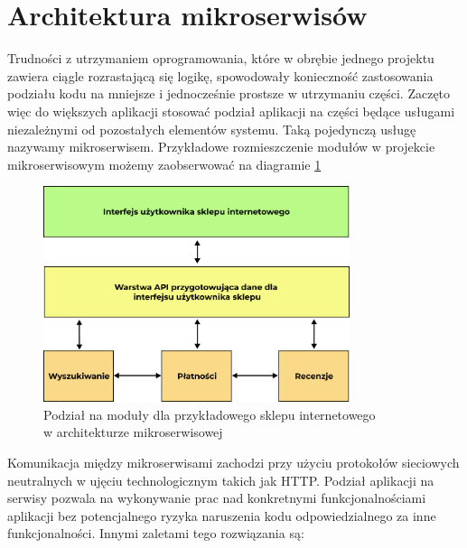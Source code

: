 \documentclass{SGGW-thesis}
\begin{document}
  \section{Architektura mikroserwisów}

  Trudności z utrzymaniem oprogramowania, które w obrębie jednego projektu zawiera ciągle rozrastającą się logikę, spowodowały konieczność zastosowania podziału kodu na mniejsze i jednocześnie prostsze w utrzymaniu części. 
  Zaczęto więc do większych aplikacji stosować podział aplikacji na części będące usługami niezależnymi od pozostałych elementów systemu. Taką pojedynczą usługę nazywamy mikroserwisem. Przykładowe rozmieszczenie modułów w projekcie mikroserwisowym możemy zaobserwować na diagramie \ref{fig:microservices_diagram}


  \begin{figure}[h]
    \centering
    \captionsetup{justification=centering}
    \includegraphics[width=0.8\textwidth]{microservices_diagram.png}
    \caption{Podział na moduły dla przykładowego sklepu internetowego \\ w architekturze mikroserwisowej}
    \label{fig:microservices_diagram}
  \end{figure}

  Komunikacja między mikroserwisami zachodzi przy użyciu protokołów sieciowych neutralnych w ujęciu technologicznym takich jak HTTP. Podział aplikacji na serwisy pozwala na wykonywanie prac nad konkretnymi funkcjonalnościami aplikacji bez potencjalnego ryzyka naruszenia kodu odpowiedzialnego za inne funkcjonalności. Innymi zaletami tego rozwiązania są:
\end{document}
